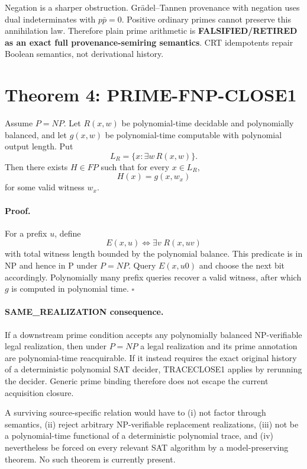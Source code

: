 \documentclass[11pt]{article}
\begin{document}
Negation is a sharper obstruction. Gr\"adel--Tannen provenance with negation uses dual indeterminates with \(p\bar p=0\). Positive ordinary primes cannot preserve this annihilation law. Therefore plain prime arithmetic is \textbf{FALSIFIED/RETIRED as an exact full provenance-semiring semantics}. CRT idempotents repair Boolean semantics, not derivational history.

\section*{Theorem 4: PRIME-FNP-CLOSE1}
Assume \(P=NP\). Let \(R(x,w)\) be polynomial-time decidable and polynomially balanced, and let \(g(x,w)\) be polynomial-time computable with polynomial output length. Put
\[
L_R=\{x:\exists w\,R(x,w)\}.
\]
Then there exists \(H\in FP\) such that for every \(x\in L_R\),
\[
H(x)=g(x,w_x)
\]
for some valid witness \(w_x\).

\paragraph{Proof.}
For a prefix \(u\), define
\[
E(x,u)\iff\exists v\;R(x,uv)
\]
with total witness length bounded by the polynomial balance. This predicate is in NP and hence in P under \(P=NP\). Query \(E(x,u0)\) and choose the next bit accordingly. Polynomially many prefix queries recover a valid witness, after which \(g\) is computed in polynomial time. \(\square\)

\paragraph{SAME\_REALIZATION consequence.}
If a downstream prime condition accepts any polynomially balanced NP-verifiable legal realization, then under \(P=NP\) a legal realization and its prime annotation are polynomial-time reacquirable. If it instead requires the exact original history of a deterministic polynomial SAT decider, TRACECLOSE1 applies by rerunning the decider. Generic prime binding therefore does not escape the current acquisition closure.

A surviving source-specific relation would have to (i) not factor through semantics, (ii) reject arbitrary NP-verifiable replacement realizations, (iii) not be a polynomial-time functional of a deterministic polynomial trace, and (iv) nevertheless be forced on every relevant SAT algorithm by a model-preserving theorem. No such theorem is currently present.
\end{document}
